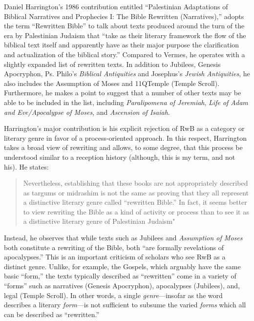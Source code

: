 Daniel Harrington's 1986 contribution entitled ``Palestinian Adaptations
of Biblical Narratives and Prophecies I: The Bible Rewritten
(Narratives),'' adopts the term ``Rewritten Bible'' to talk about texts
produced around the turn of the era by Palestinian Judaism that ``take
as their literary framework the flow of the biblical text itself and
apparently have as their major purpose the clarification and
actualization of the biblical
story.''\autocite[239]{harrington_kraft-nickelsburg1986} Compared to
Vermes, he operates with a slightly expanded list of rewritten texts. In
addition to Jubilees, Genesis Apocryphon, Ps. Philo's \emph{Biblical
Antiquities} and Josephus's \emph{Jewish Antiquities}, he also includes
the Assumption of Moses and 11QTemple (Temple Scroll). Furthermore, he
makes a point to suggest that a number of other texts may be able to be
included in the list, including \emph{Paralipomena of Jeremiah},
\emph{Life of Adam and Eve/Apocalypse of Moses}, and \emph{Ascension of
Isaiah}.

Harrington's major contribution is his explicit rejection of RwB as a
category or literary genre in favor of a process-oriented approach. In
this respect, Harrington takes a broad view of rewriting and allows, to
some degree, that this process be understood similar to a reception
history (although, this is my term, and not his). He states:

\begin{quote}
Nevertheless, establishing that these books are not appropriately
described as targums or midrashim is not the same as proving that they
all represent a distinctive literary genre called ``rewritten Bible.''
In fact, it seems better to view rewriting the Bible as a kind of
activity or process than to see it as a distinctive literary genre of
Palestinian Judaism"
\autocite[242--243]{harrington_kraft-nickelsburg1986}
\end{quote}

Instead, he observes that while texts such as Jubilees and
\emph{Assumption of Moses} both constitute a rewriting of the Bible,
both ``are formally revelations of
apocalypses.''\autocite[243]{harrington_kraft-nickelsburg1986} This is
an important criticism of scholars who see RwB as a distinct genre.
Unlike, for example, the Gospels, which arguably have the same basic
``form,'' the texts typically described as ``rewritten'' come in a
variety of ``forms'' such as narratives (Genesis Apocryphon),
apocalypses (Jubilees), and, legal (Temple Scroll). In other words, a
single \emph{genre}---insofar as the word describes a literary
\emph{form}---is not sufficient to subsume the varied \emph{forms} which
all can be described as ``rewritten.''

